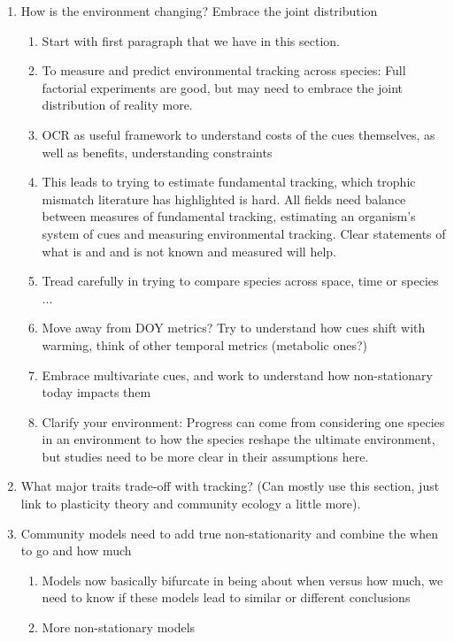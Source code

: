 \documentclass[11pt,letterpaper]{article}
\begin{document}
\begin{enumerate}
\item How is the environment changing? Embrace the joint distribution 
\begin{enumerate}
\item Start with first paragraph that we have in this section.
\item To measure and predict environmental tracking across species: Full factorial experiments are good, but may need to embrace the joint distribution of reality more.
\item OCR as useful framework to understand costs of the cues themselves, as well as benefits, understanding constraints
\item This leads to trying to estimate fundamental tracking, which trophic mismatch literature has highlighted is hard. All fields need balance between measures of fundamental tracking, estimating an organism's system of cues and measuring environmental tracking. Clear statements of what is and and is not known and measured will help. 
\item Tread carefully in trying to compare species across space, time or species ... 
\item Move away from DOY metrics? Try to understand how cues shift with warming, think of other temporal metrics (metabolic ones?)
\item Embrace multivariate cues, and work to understand how non-stationary today impacts them
\item Clarify your environment: Progress can come from considering one species in an environment to how the species reshape the ultimate environment, but studies need to be more clear in their assumptions here. 
\end{enumerate}
\item What major traits trade-off with tracking? (Can mostly use this section, just link to plasticity theory and community ecology a little more). 
\item Community models need to add true non-stationarity and combine the when to go and how much
\begin{enumerate}
\item Models now basically bifurcate in being about when versus how much, we need to know if these models lead to similar or different conclusions
\item More non-stationary models
\end{enumerate}
\end{enumerate}
\end{document}
